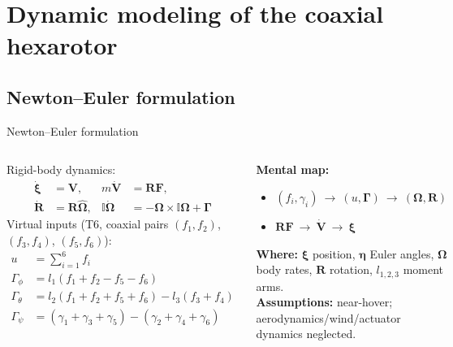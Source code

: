 \documentclass{beamer}
\begin{document}
\section{Dynamic modeling of the coaxial hexarotor}

\subsection{Newton--Euler formulation}
\begin{frame}{Newton--Euler formulation}
\begin{columns}
\column{6.2cm}
\small
Rigid-body dynamics:
\begin{align*}
\dot{\bm{\xi}} &= \bm{V}, & m\dot{\bm{V}} &= \bm{R}\bm{F},\\
\dot{\bm{R}} &= \bm{R}\hat{\bm{\Omega}}, & \mathbb{I}\dot{\bm{\Omega}} &= -\bm{\Omega}\times\mathbb{I}\bm{\Omega}+\bm{\Gamma}
\end{align*}
Virtual inputs (T6, coaxial pairs $(f_1,f_2)$, $(f_3,f_4)$, $(f_5,f_6)$):
\begin{align*}
u &= \textstyle\sum_{i=1}^{6} f_i\\
\Gamma_\phi &= l_1(f_1+f_2-f_5-f_6)\\
\Gamma_\theta &= l_2(f_1+f_2+f_5+f_6)-l_3(f_3+f_4)\\
\Gamma_\psi &= (\gamma_1+\gamma_3+\gamma_5)-(\gamma_2+\gamma_4+\gamma_6)
\end{align*}

\column{4.8cm}
\begin{tcolorbox}[colback=morado!10,colframe=morado!80,left=0.8mm,right=0.8mm,top=0.6mm,bottom=0.6mm]
\scriptsize
\textbf{Mental map:}
\begin{itemize}\setlength\itemsep{0pt}
    \item $(f_i,\gamma_i)\ \rightarrow\ (u,\bm{\Gamma})\ \rightarrow\ (\bm{\Omega},\bm{R})$
    \item $\bm{R}\bm{F}\ \rightarrow\ \dot{\bm{V}}\ \rightarrow\ \bm{\xi}$
\end{itemize}
\textbf{Where:} $\bm{\xi}$ position, $\bm{\eta}$ Euler angles, $\bm{\Omega}$ body rates, $\bm{R}$ rotation, $l_{1,2,3}$ moment arms.
\\[0.05cm]
\textbf{Assumptions:} near-hover; aerodynamics/wind/actuator dynamics neglected.
\end{tcolorbox}
\end{columns}
\end{frame}
\end{document}
